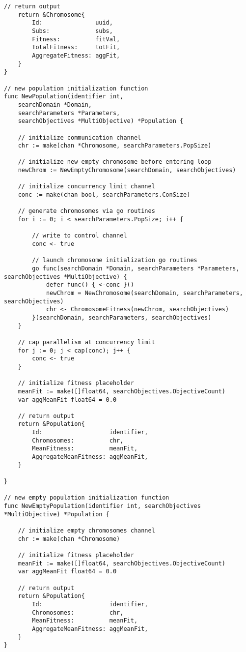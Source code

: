 \begin{lstlisting}[basicstyle=\tiny]
	// return output
	return &Chromosome{
		Id:               uuid,
		Subs:             subs,
		Fitness:          fitVal,
		TotalFitness:     totFit,
		AggregateFitness: aggFit,
	}
}

// new population initialization function
func NewPopulation(identifier int, 
    searchDomain *Domain, 
    searchParameters *Parameters, 
    searchObjectives *MultiObjective) *Population {

	// initialize communication channel
	chr := make(chan *Chromosome, searchParameters.PopSize)

	// initialize new empty chromosome before entering loop
	newChrom := NewEmptyChromosome(searchDomain, searchObjectives)

	// initialize concurrency limit channel
	conc := make(chan bool, searchParameters.ConSize)

	// generate chromosomes via go routines
	for i := 0; i < searchParameters.PopSize; i++ {

		// write to control channel
		conc <- true

		// launch chromosome initialization go routines
		go func(searchDomain *Domain, searchParameters *Parameters, searchObjectives *MultiObjective) {
			defer func() { <-conc }()
			newChrom = NewChromosome(searchDomain, searchParameters, searchObjectives)
			chr <- ChromosomeFitness(newChrom, searchObjectives)
		}(searchDomain, searchParameters, searchObjectives)
	}

	// cap parallelism at concurrency limit
	for j := 0; j < cap(conc); j++ {
		conc <- true
	}

	// initialize fitness placeholder
	meanFit := make([]float64, searchObjectives.ObjectiveCount)
	var aggMeanFit float64 = 0.0

	// return output
	return &Population{
		Id:                   identifier,
		Chromosomes:          chr,
		MeanFitness:          meanFit,
		AggregateMeanFitness: aggMeanFit,
	}

}

// new empty population initialization function
func NewEmptyPopulation(identifier int, searchObjectives *MultiObjective) *Population {

	// initialize empty chromosomes channel
	chr := make(chan *Chromosome)

	// initialize fitness placeholder
	meanFit := make([]float64, searchObjectives.ObjectiveCount)
	var aggMeanFit float64 = 0.0

	// return output
	return &Population{
		Id:                   identifier,
		Chromosomes:          chr,
		MeanFitness:          meanFit,
		AggregateMeanFitness: aggMeanFit,
	}
}


\end{lstlisting}
